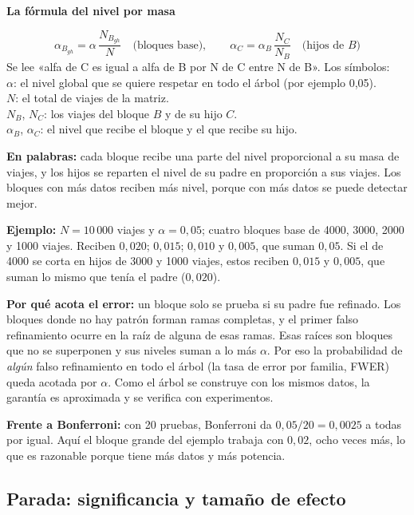 \documentclass[11pt,a4paper]{article}
\newcommand{\cajainicio}[3]{\par\medskip\noindent
  \begin{lrbox}{\cajabox}\begin{minipage}{\dimexpr\linewidth-2\fboxsep-2\fboxrule\relax}%
  \textbf{\color{#1}#3}\par\smallskip}
\newcommand{\cajafin}[2]{\end{minipage}\end{lrbox}\fcolorbox{#1}{#2}{\usebox{\cajabox}}\par\medskip}
\newenvironment{nota}[1]{\cajainicio{acc}{acc!7}{#1}}{\cajafin{acc}{acc!7}}
\begin{document}
\begin{nota}{La fórmula del nivel por masa}
\[ \alpha_{B_{gh}}=\alpha\,\frac{N_{B_{gh}}}{N}\quad\text{(bloques base)},\qquad \alpha_C=\alpha_B\,\frac{N_C}{N_B}\quad\text{(hijos de }B\text{)} \]
Se lee «alfa de C es igual a alfa de B por N de C entre N de B». Los símbolos:\\
$\alpha$: el nivel global que se quiere respetar en todo el árbol (por ejemplo 0,05).\\
$N$: el total de viajes de la matriz.\\
$N_B$, $N_C$: los viajes del bloque $B$ y de su hijo $C$.\\
$\alpha_B$, $\alpha_C$: el nivel que recibe el bloque y el que recibe su hijo.

\textbf{En palabras:} cada bloque recibe una parte del nivel proporcional a su masa de viajes, y los hijos se reparten el nivel de su padre en proporción a sus viajes. Los bloques con más datos reciben más nivel, porque con más datos se puede detectar mejor.

\textbf{Ejemplo:} $N=10\,000$ viajes y $\alpha=0{,}05$; cuatro bloques base de 4000, 3000, 2000 y 1000 viajes. Reciben $0{,}020$; $0{,}015$; $0{,}010$ y $0{,}005$, que suman $0{,}05$. Si el de 4000 se corta en hijos de 3000 y 1000 viajes, estos reciben $0{,}015$ y $0{,}005$, que suman lo mismo que tenía el padre ($0{,}020$).

\textbf{Por qué acota el error:} un bloque solo se prueba si su padre fue refinado. Los bloques donde no hay patrón forman ramas completas, y el primer falso refinamiento ocurre en la raíz de alguna de esas ramas. Esas raíces son bloques que no se superponen y sus niveles suman a lo más $\alpha$. Por eso la probabilidad de \emph{algún} falso refinamiento en todo el árbol (la tasa de error por familia, FWER) queda acotada por $\alpha$. Como el árbol se construye con los mismos datos, la garantía es aproximada y se verifica con experimentos.

\textbf{Frente a Bonferroni:} con 20 pruebas, Bonferroni da $0{,}05/20=0{,}0025$ a todas por igual. Aquí el bloque grande del ejemplo trabaja con $0{,}02$, ocho veces más, lo que es razonable porque tiene más datos y más potencia.
\end{nota}

\subsection*{Parada: significancia y tamaño de efecto}
\end{document}

